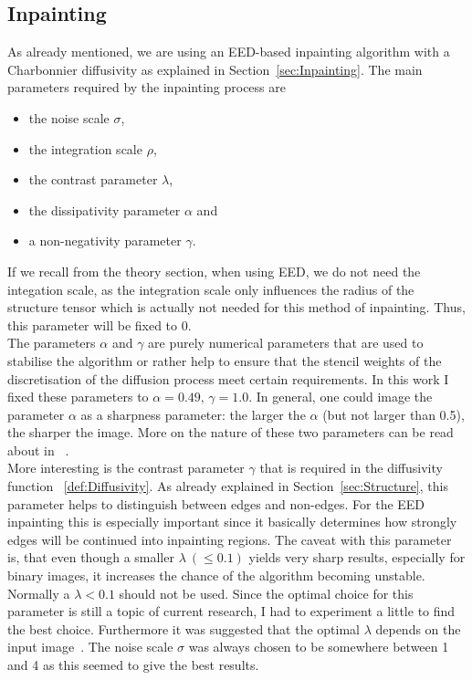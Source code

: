 \subsection{Inpainting}\label{sec:InpaintingEx}
As already mentioned, we are using an EED-based inpainting algorithm with a Charbonnier diffusivity
as explained in Section~\ref{sec:Inpainting}.
The main parameters required by the inpainting process are 
\begin{itemize}
    \item the noise scale $\sigma$,
    \item the integration scale $\rho$,
    \item the contrast parameter $\lambda$, 
    \item the dissipativity parameter $\alpha$ and
    \item a non-negativity parameter $\gamma$.
\end{itemize}
If we recall from the theory section, when using EED, we do not need the integation scale, as the
integration scale only influences the radius of the structure tensor which is actually not needed
for this method of inpainting. Thus, this parameter will be fixed to 0.\\
The parameters $\alpha$ and $\gamma$ are purely numerical parameters that are used to 
stabilise the algorithm or rather help to ensure that the stencil weights of the discretisation of
the diffusion process meet certain requirements.
In this work I fixed these parameters to $\alpha=0.49,\, \gamma=1.0$\cite{conversation}. In general, one could image the parameter $\alpha$ as a sharpness parameter: the larger the
$\alpha$ (but not larger than 0.5), the sharper the image. More on the nature of these two parameters can be read about in
~\cite{www13, weickert96}.\\
More interesting is the contrast parameter $\gamma$ that is required in the diffusivity function
~\eqref{def:Diffusivity}. As already explained in Section~\ref{sec:Structure}, this parameter helps to
distinguish between edges and non-edges. For the EED inpainting this is especially important since
it basically determines how strongly edges will be continued into inpainting regions. 
The caveat with this parameter is, that even though a smaller $\lambda\ (\leq0.1)$ yields very sharp
results, especially for binary images, it increases the chance of the algorithm becoming unstable.
Normally a $\lambda<0.1$ should not be used\cite{conversation}. Since the optimal choice for this parameter is still a
topic of current research, I had to experiment a little to find the best choice. Furthermore it was
suggested that the optimal $\lambda$ depends on the input image~\cite{schmaltz14}. 
The noise scale $\sigma$ was always chosen to be somewhere between 1 and 4 as this seemed to give
the best results.
